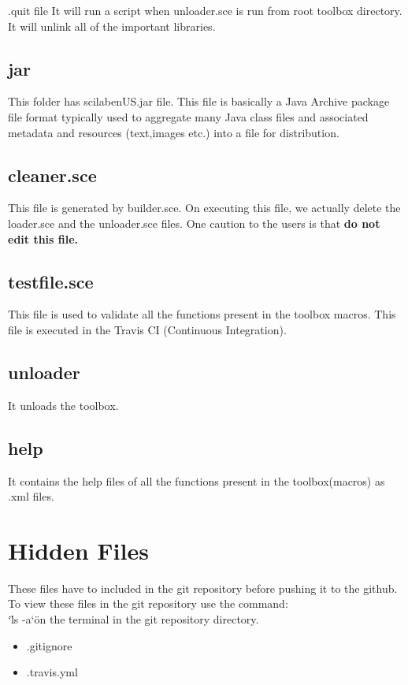 \documentclass[12pt,a4paper]{report}
\begin{document}
.quit file
It will run a script when unloader.sce is run from root toolbox directory. It will unlink all of the important libraries.


\subsection{jar}
This folder has scilab\textunderscore en\textunderscore US.jar file. This file is basically a Java Archive package file format typically used to aggregate many Java class files and associated metadata and resources (text,images etc.) into a file for distribution.

\subsection{cleaner.sce}
This file is generated by builder.sce. On executing this file, we actually delete the loader.sce and the unloader.sce files.
One caution to the users is that  \textbf{do not edit this file.}

\subsection{testfile.sce}
This file is used to validate all the functions present in the toolbox macros. This file is executed in the Travis CI (Continuous Integration).

\subsection{unloader}
It unloads the toolbox.

\subsection{help}
It contains the help files of all the functions present in the toolbox(macros) as .xml files.

\section{Hidden Files}
These files have to included in the git repository before pushing it to the github. To view these files in the git repository use the command:  \\
\char`\"ls -a\char`\"   on the terminal in the git repository directory.  


\begin{itemize}
\item .gitignore 
\item .travis.yml
\end{itemize}
\end{document}

